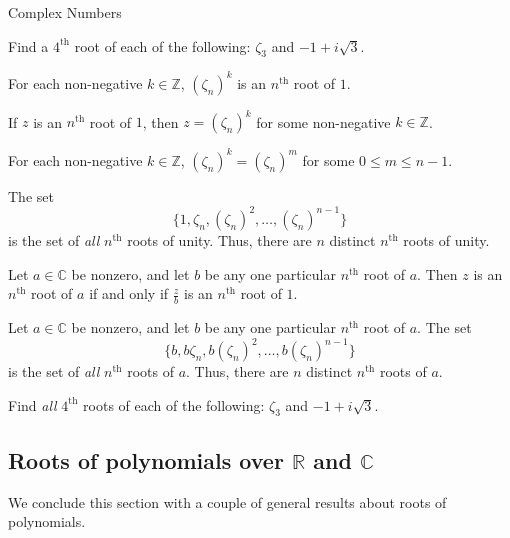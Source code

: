 \begin{section}{Complex Numbers}
\begin{problem}
Find a $4^\text{th}$ root of each of the following: $\zeta_3$ and $-1 + i\sqrt{3}$.
\end{problem}

\begin{theorem}
For each non-negative $k\in \mathbb{Z}$, $(\zeta_n)^k$ is an $n^\text{th}$ root of $1$.
\end{theorem}

\begin{lemma}\label{lem.nthRoot1IsPowerOfZeta}
If $z$ is an $n^\text{th}$ root of $1$, then $z = (\zeta_n)^k$ for some non-negative $k\in \mathbb{Z}$.
\end{lemma}

\begin{lemma}
For each non-negative $k\in \mathbb{Z}$, $(\zeta_n)^k = (\zeta_n)^m$ for some $0\le m \le n-1$.
\end{lemma}

\begin{theorem}\label{thm.nthRoots1}
The set \[\{1, \zeta_n, (\zeta_n)^2, \ldots, (\zeta_n)^{n-1}\}\] is the set of \emph{all} $n^\text{th}$ roots of unity. Thus, there are $n$ distinct $n^\text{th}$ roots of unity. 
\end{theorem}

\begin{lemma}
Let $a\in \mathbb{C}$ be nonzero, and let $b$ be any one particular $n^\text{th}$ root of $a$. Then $z$ is an $n^\text{th}$ root of $a$ if and only if $\frac{z}{b}$ is an $n^\text{th}$ root of $1$.
\end{lemma}

\begin{theorem}\label{thm.nthRoots}
Let $a\in \mathbb{C}$ be nonzero, and let $b$ be any one particular $n^\text{th}$ root of $a$. The set \[\{b, b\zeta_n, b(\zeta_n)^2, \ldots, b(\zeta_n)^{n-1}\}\] is the set of \emph{all} $n^\text{th}$ roots of $a$. Thus, there are $n$ distinct $n^\text{th}$ roots of $a$. 
\end{theorem}

\begin{problem}
Find \emph{all} $4^\text{th}$ roots of each of the following: $\zeta_3$ and $-1 + i\sqrt{3}$.
\end{problem}

\subsection{Roots of polynomials over  $\mathbb{R}$ and  $\mathbb{C}$}
We conclude this section with a couple of general results about roots of polynomials.


\end{section}
